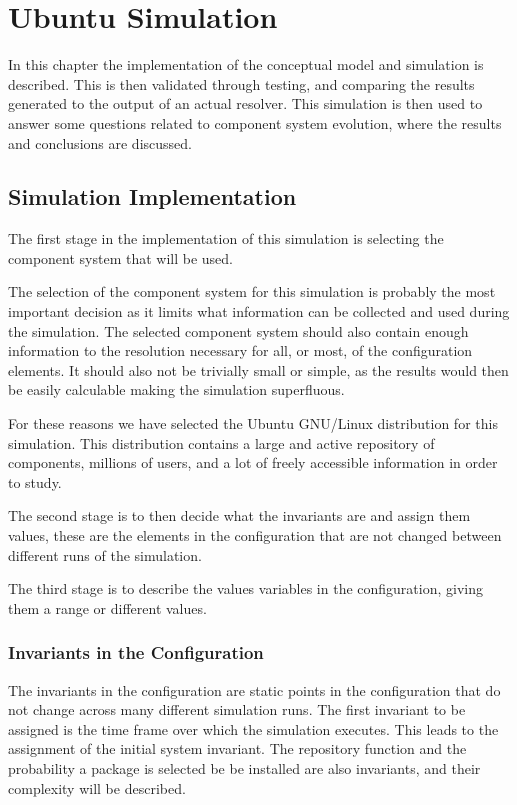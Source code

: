 
\chapter{Ubuntu Simulation}
\label{ubunutsimulation}
{}In this chapter the implementation of the conceptual model and simulation is described.
{}This is then validated through testing, and comparing the results generated to the output of an actual resolver. 
{}This simulation is then used to answer some questions related to component system evolution, where the results and conclusions are discussed.

\section{Simulation Implementation}
The first stage in the implementation of this simulation is selecting the component system that will be used.

The selection of the component system for this simulation is probably the most important decision as it limits what information can be collected and used during the simulation.
The selected component system should also contain enough information to the resolution necessary for all, or most, of the configuration elements.
It should also not be trivially small or simple, as the results would then be easily calculable making the simulation superfluous.

For these reasons we have selected the Ubuntu GNU/Linux distribution for this simulation.
This distribution contains a large and active repository of components, millions of users, and a lot of freely accessible information in order to study.

The second stage is to then decide what the invariants are and assign them values, these are the elements in the configuration that are not changed between different runs of the simulation.

The third stage is to describe the values variables in the configuration, giving them a range or different values.

\subsection{Invariants in the Configuration}
The invariants in the configuration are static points in the configuration that do not change across many different simulation runs.
The first invariant to be assigned is the time frame over which the simulation executes.
This leads to the assignment of the initial system invariant.
The repository function and the probability a package is selected be be installed are also invariants, and their complexity will be described.

